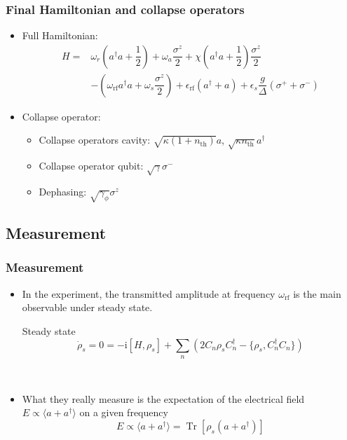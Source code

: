 \documentclass[xcolor=dvipsnames,hyperref={CJKbookmarks=true}]{beamer}
\newcommand\mi{\mathrm{i}}
\newcommand{\rf}{\text{rf}}
\newcommand{\thm}{\text{th}}
\DeclareMathOperator{\Tr}{Tr}
\begin{document}
\begin{frame}
\frametitle{Final Hamiltonian and collapse operators}
\begin{itemize}
	\item Full Hamiltonian: 
\begin{align*}
H =& \omega_r \left(a^{\dagger} a+ \dfrac{1}{2} \right) +  \omega_a \dfrac{\sigma^{z}}{2}+ \chi \left(a^{\dagger}a+\dfrac{1}{2} \right)\dfrac{\sigma^{z}}{2}\\
& - \left( \omega_{\rf}a^{\dagger}a +\omega_s \dfrac{\sigma^{z}}{2} \right) + \epsilon_{\rf}\left(a^{\dagger}+a\right) 
+  \epsilon_{s}\dfrac{g}{\Delta}\left(\sigma^{+}+\sigma^{-} \right)
\end{align*}
	\item Collapse operator: 
	\begin{itemize}
		\item  Collapse operators cavity: 
		$\sqrt{\kappa \left(1+n_{\thm} \right)}a$, 
		$\sqrt{\kappa n_{\thm} }a^{\dagger}$
		\item Collapse operator qubit:  
		$\sqrt{\gamma}\sigma^{-}$
		\item Dephasing: 
		$\sqrt{\gamma_{\phi}}\sigma^{z}$
	\end{itemize}
\end{itemize}
\end{frame}

\subsection{Measurement}
\begin{frame}[t]\frametitle{Measurement}
	\begin{itemize}
		\item In the experiment, the transmitted amplitude at frequency $\omega_{\rf}$ is the main observable under steady state. 
	\begin{block}{Steady state}
	$$
	\dot\rho_s = 0 = -\mi[H, \rho_{s}] + \sum_n \left(2C_n \rho_s C_n^\dag - 
	\{\rho_s, C_n^\dag C_n\}\right)
	$$
	\end{block}
	~

		\item What they really measure is the expectation of the 
		electrical field $E\propto\langle a + a^\dag \rangle$ \cite{schuster2007circuit} on a given frequency
	$$
	E\propto \langle a + a^\dag \rangle = \Tr [\rho_{s}(a+a^\dag)]
	$$
	\end{itemize}
\end{frame}
\end{document}
